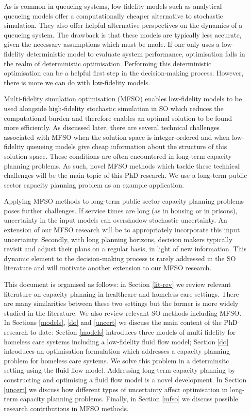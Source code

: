 \documentclass[12pt,a4paper]{article}
\begin{document}
As is common in queueing systems, low-fidelity models such as analytical queueing models offer a computationally cheaper alternative to stochastic simulation. They also offer helpful alternative perspectives on the dynamics of a queueing system. The drawback is that these models are typically less accurate, given the necessary assumptions which must be made. If one only uses a low-fidelity deterministic model to evaluate system performance, optimisation falls in the realm of deterministic optimisation. Performing this deterministic optimisation can be a helpful first step in the decision-making process. However, there is more we can do with low-fidelity models.

Multi-fidelity simulation optimisation (MFSO) enables low-fidelity models to be used alongside high-fidelity stochastic simulation in SO which reduces the computational burden and therefore enables an optimal solution to be found more efficiently. As discussed later, there are several technical challenges associated with MFSO when the solution space is integer-ordered and when low-fidelity queueing models give cheap information about the structure of this solution space. These conditions are often encountered in long-term capacity planning problems. As such, novel MFSO methods which tackle these technical challenges will be the main topic of this PhD research. We use a long-term public sector capacity planning problem as an example application.

Applying MFSO methods to long-term public sector capacity planning problems poses further challenges. If service times are long (as in housing or in prisons), uncertainty in the input models can overshadow stochastic uncertainty. An extension of our MFSO research will be to appropriately incorporate this input uncertainty. Secondly, with long planning horizons, decision makers typically revisit and adjust their plans on a regular basis, in light of new information. This dynamic element to the decision-making process is rarely addressed in the SO literature and will motivate another extension to our MFSO research. 

This document is organised as follows: in Section \ref{lit-rev} we review relevant literature on capacity planning in healthcare and  homeless care settings. There are many similarities between these two settings but the former is more widely studied in the literature. We also review relevant SO methods including MFSO. In Sections \ref{models}, \ref{do} and \ref{uncert} we discuss the main content of the PhD research to date: Section \ref{models} introduces three models of multi fidelity for homeless care systems including a low-fidelity fluid flow model; Section \ref{do} introduces an optimisation formulation which addresses a capacity planning problem for homeless care systems. We solve this problem in a determinsitc setting using the fluid flow model. Addressing long-term capacity planning by constructing and optimising a fluid flow model \citep{burgess2024time} is a novel development. In Section \ref{uncert} we discuss how different types of uncertainty affect optimisation in long-term capacity planning problems. Finally, in Section \ref{mfso} we discuss possible research contributions in MFSO methods. 
\end{document}
